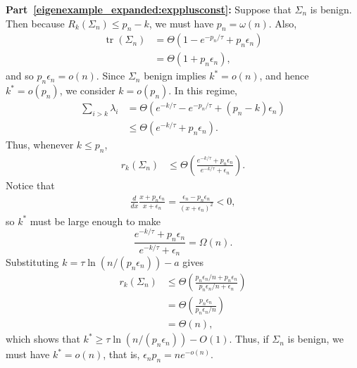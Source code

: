 \documentclass[11pt,notitlepage]{article}
\newcommand\tr {\ensuremath{\operatorname{\mathrm{tr}}}}
\begin{document}
\noindent
{\bf Part~\ref{eigenexample_expanded:expplusconst}:}
Suppose that $\Sigma_n$ is benign. Then because
$R_{k}(\Sigma_n)\le p_n-k$, we must have $p_n=\omega(n)$. Also,
  \begin{align*}
    \tr(\Sigma_n)
      & = \Theta\left(1-e^{-p_n/\tau} + p_n\epsilon_n\right) \\
      & = \Theta\left(1 + p_n\epsilon_n\right),
  \end{align*}
and so $p_n\epsilon_n=o(n)$.
Since $\Sigma_n$ benign implies $k^*=o(n)$, and hence $k^*=o(p_n)$, we
consider $k=o(p_n)$. In this regime,
  \begin{align*}
    \sum_{i>k}\lambda_i
      & = \Theta\left(e^{-k/\tau}-e^{-p_n/\tau}
        + (p_n-k)\epsilon_n\right) \\
      & \le \Theta\left(e^{-k/\tau} + p_n\epsilon_n\right).
  \end{align*}
Thus, whenever $k\le p_n$,
  \begin{align*}
    r_k(\Sigma_n)
      & \le \Theta\left(
        \frac{e^{-k/\tau}+p_n\epsilon_n}{e^{-k/\tau}+\epsilon_n}\right).
  \end{align*}
Notice that
  \begin{align*}
    \frac{d}{dx}\frac{x+p_n\epsilon_n} {x+\epsilon_n}
      = \frac{\epsilon_n-p_n\epsilon_n}{(x+\epsilon_n)^2}
      <0,
  \end{align*}
so $k^*$ must be large enough to make
  \[
    \frac{e^{-k/\tau}+p_n\epsilon_n}{e^{-k/\tau}+\epsilon_n}=\Omega(n).
  \]
Substituting $k=\tau\ln(n/(p_n\epsilon_n))-a$ gives
  \begin{align*}
    r_k(\Sigma_n)
      & \le \Theta\left(
        \frac{p_n\epsilon_n/n + p_n\epsilon_n}
        {p_n\epsilon_n/n + \epsilon_n}\right) \\
      & = \Theta\left(
        \frac{p_n\epsilon_n}
        {p_n\epsilon_n/n}\right) \\
      & = \Theta\left(n\right),
  \end{align*}
which shows that
$k^*\ge\tau\ln(n/(p_n\epsilon_n))-O(1)$.
Thus, if $\Sigma_n$ is benign, we must have $k^*=o(n)$, that is,
$\epsilon_np_n=ne^{-o(n)}$.
\end{document}
